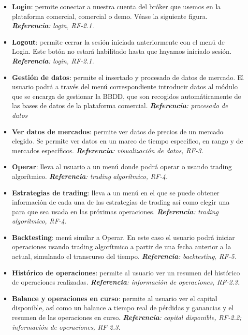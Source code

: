 \begin{itemize}
	\item \textbf{Login}: permite conectar a nuestra cuenta del bróker que usemos en la plataforma comercial, comercial o demo. Véase la siguiente figura. \textit{\textbf{Referencia}: login, RF-2.1.}
	\item \textbf{Logout}: permite cerrar la sesión iniciada anteriormente con el menú de Login. Este botón no estará habilitado hasta que hayamos iniciado sesión. \textit{\textbf{Referencia}: login, RF-2.1.}
	\item \textbf{Gestión de datos}: permite el insertado y procesado de datos de mercado. El usuario podrá a través del menú correspondiente introducir datos al módulo que se encarga de gestionar la BBDD, que son recogidos automáticamente de las bases de datos de la plataforma comercial. \textit{\textbf{Referencia}: procesado de datos}
	\item \textbf{Ver datos de mercados}: permite ver datos de precios de un mercado elegido. Se permite ver datos en un marco de tiempo específico, en rango y de mercados específicos. \textit{\textbf{Referencia}: visualización de datos, RF-3.}
	\item \textbf{Operar}: lleva al usuario a un menú donde podrá operar o usando trading algorítmico. \textit{\textbf{Referencia}: trading algorítmico, RF-4.} 
	\item \textbf{Estrategias de trading}: lleva a un menú en el que se puede obtener información de cada una de las estrategias de trading así como elegir una para que sea usada en las próximas operaciones. \textit{\textbf{Referencia}: trading algorítmico, RF-4.} 
	\item \textbf{Backtesting}: menú similar a Operar. En este caso el usuario podrá iniciar operaciones usando trading algorítmico a partir de una fecha anterior a la actual, simulando el transcurso del tiempo. \textit{\textbf{Referencia}: backtesting, RF-5.} 
	\item \textbf{Histórico de operaciones}: permite al usuario ver un resumen del histórico de operaciones realizadas. \textit{\textbf{Referencia}: información de operaciones, RF-2.3.} 
	\item \textbf{Balance y operaciones en curso}: permite al usuario ver el capital disponible, así como un balance a tiempo real de pérdidas y ganancias y el resumen de las operaciones en curso. \textit{\textbf{Referencia}: capital disponible, RF-2.2; información de operaciones, RF-2.3.} 
\end{itemize}

